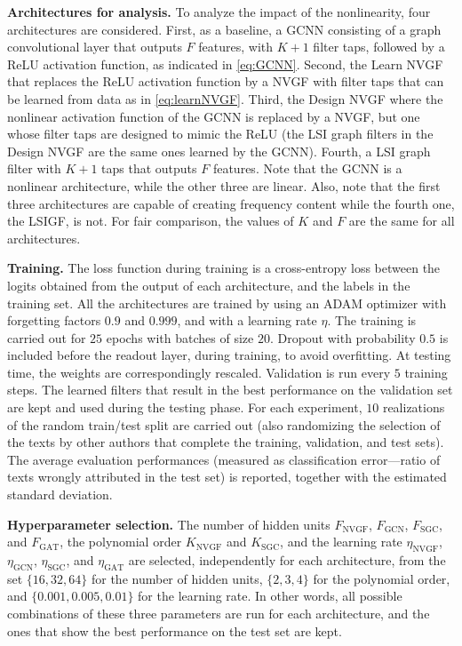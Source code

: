 \textbf{Architectures for analysis.} To analyze the impact of the nonlinearity, four architectures are considered. First, as a baseline, a GCNN consisting of a graph convolutional layer that outputs $F$ features, with $K+1$ filter taps, followed by a ReLU activation function, as indicated in \eqref{eq:GCNN}. Second, the Learn NVGF that replaces the ReLU activation function by a NVGF with filter taps that can be learned from data as in \eqref{eq:learnNVGF}. Third, the Design NVGF where the nonlinear activation function of the GCNN is replaced by a NVGF, but one whose filter taps are designed to mimic the ReLU (the LSI graph filters in the Design NVGF are the same ones learned by the GCNN). Fourth, a LSI graph filter with $K+1$ taps that outputs $F$ features. Note that the GCNN is a nonlinear architecture, while the other three are linear. Also, note that the first three architectures are capable of creating frequency content while the fourth one, the LSIGF, is not. For fair comparison, the values of $K$ and $F$ are the same for all architectures.

\textbf{Training.} The loss function during training is a cross-entropy loss between the logits obtained from the output of each architecture, and the labels in the training set. All the architectures are trained by using an ADAM optimizer \cite{Kingma15-ADAM} with forgetting factors $0.9$ and $0.999$, and with a learning rate $\eta$. The training is carried out for $25$ epochs with batches of size $20$. Dropout with probability $0.5$ is included before the readout layer, during training, to avoid overfitting. At testing time, the weights are correspondingly rescaled. Validation is run every $5$ training steps. The learned filters that result in the best performance on the validation set are kept and used during the testing phase. For each experiment, $10$ realizations of the random train/test split are carried out (also randomizing the selection of the texts by other authors that complete the training, validation, and test sets). The average evaluation performances (measured as classification error---ratio of texts wrongly attributed in the test set) is reported, together with the estimated standard deviation.

\textbf{Hyperparameter selection.} The number of hidden units $F_{\text{NVGF}}$, $F_{\text{GCN}}$, $F_{\text{SGC}}$, and $F_{\text{GAT}}$, the polynomial order $K_{\text{NVGF}}$ and $K_{\text{SGC}}$, and the learning rate $\eta_{\text{NVGF}}$, $\eta_{\text{GCN}}$, $\eta_{\text{SGC}}$, and $\eta_{\text{GAT}}$ are selected, independently for each architecture, from the set $\{16,32,64\}$ for the number of hidden units, $\{2, 3, 4\}$ for the polynomial order, and $\{0.001, 0.005, 0.01\}$ for the learning rate. In other words, all possible combinations of these three parameters are run for each architecture, and the ones that show the best performance on the test set are kept.

